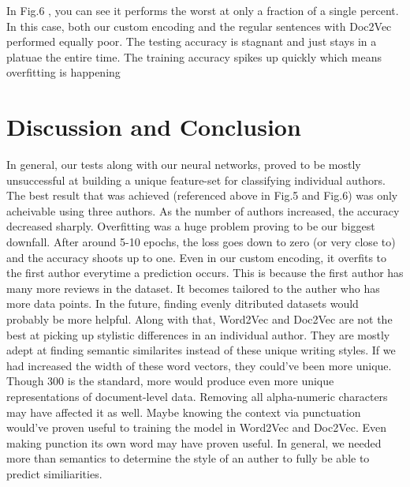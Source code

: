 \documentclass[conference]{IEEEtran}
\begin{document}
In Fig.6 , you can see it performs the worst at only a fraction of a
single percent. In this case, both our custom encoding and the regular
sentences with Doc2Vec performed equally poor. The testing accuracy is
stagnant and just stays in a platuae the entire time. The training
accuracy spikes up quickly which means overfitting is happening

\section{Discussion and Conclusion}

    In general, our tests along with our neural networks, proved to be mostly unsuccessful at building a unique feature-set for classifying individual authors. The best result that was achieved (referenced above in Fig.5 and Fig.6) was only acheivable using three authors. As the number of authors increased, the accuracy decreased sharply. Overfitting was a huge problem proving to be our biggest downfall. After around 5-10 epochs, the loss goes down to zero (or very close to) and the accuracy shoots up to one. Even in our custom encoding, it overfits to the first author everytime a prediction occurs. This is because the first author has many more reviews in the dataset. It becomes tailored to the auther who has more data points. In the future, finding evenly ditributed datasets would probably be more helpful. Along with that, Word2Vec and Doc2Vec are not the best at picking up stylistic differences in an individual author. They are mostly adept at finding semantic similarites instead of these unique writing styles. If we had increased the width of these word vectors, they could've been more unique. Though 300 is the standard, more would produce even more unique representations of document-level data. Removing all alpha-numeric characters may have affected it as well. Maybe knowing the context via punctuation would've proven useful to training the model in Word2Vec and Doc2Vec. Even making punction its own word may have proven useful. In general, we needed more than semantics to determine the style of an auther to fully be able to predict similiarities.\cite{b5}


\end{document}
